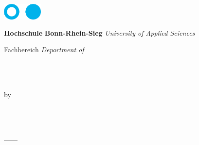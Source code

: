 \begin{titlepage}
\setlength{\wpYoffset}{22mm}



\hspace{16mm}
\parbox[t][][c]{20mm}{
	\includegraphics[width=20mm]{./img/icons/fhlogo.pdf}
}
\hspace{8mm}
\parbox[t][][c]{\textwidth - 49mm}{
	\vspace{1mm}
	\textbf{Hochschule} \newline
	\textbf{Bonn-Rhein-Sieg} \newline
	\small{\textit{University of Applied Sciences}} \newline
	\par Fachbereich \DepartmentGER \newline
	\small{\textit{Department of \Department}}
}
\vspace{40mm}

\begin{center}
\Huge \textbf{\DocumentType} \\
\vspace{5mm}
\large \CourseOfStudies \\
\vspace{30mm}
\huge \textbf{\DocumentTitle} \\
\vspace{26mm}
\large by \\
\vspace{1em}
\Large \textbf{\Author} \\
\vspace{2em}
\Large \textbf{\SecondAuthor} \\
\vspace{2em}
\Large \textbf{\ThirdAuthor} \\
\end{center}

\begin{table}[!b]
\centering
\begin{tabular}{ll}
               &                    \\
\DateOfSubmission	\\
\end{tabular}
\end{table}
\restoregeometry
\end{titlepage}